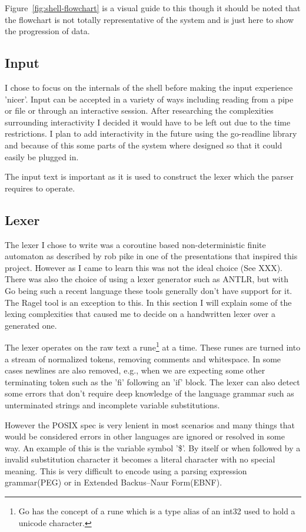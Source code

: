 Figure~\ref{fig:shell-flowchart} is a visual guide to this though it should be noted that the flowchart is not totally representative of the system and is just here to show the progression of data.


\subsection{Input}
I chose to focus on the internals of the shell before making the input experience 'nicer'.
Input can be accepted in a variety of ways including reading from a pipe or file or through an interactive session.
After researching the complexities surrounding interactivity I decided it would have to be left out due to the time restrictions.
I plan to add interactivity in the future using the go-readline library\cite{GO-READLINE} and because of this some parts of the system where designed so that it could easily be plugged in.

The input text is important as it is used to construct the lexer which the parser requires to operate.

\subsection{Lexer}
The lexer I chose to write was a coroutine based non-deterministic finite automaton as described by rob pike in one of the presentations that inspired this project\cite{PIKE-LEXING-VIDEO}.
However as I came to learn this was not the ideal choice (See XXX).
There was also the choice of using a lexer generator such as ANTLR, but with Go being such a recent language these tools generally don't have support for it.
The Ragel tool is an exception to this.
In this section I will explain some of the lexing complexities that caused me to decide on a handwritten lexer over a generated one.

The lexer operates on the raw text a rune\footnote{Go has the concept of a rune which is a type alias of an int32 used to hold a unicode character.} at a time.
These runes are turned into a stream of normalized tokens, removing comments and whitespace.
In some cases newlines are also removed, e.g., when we are expecting some other terminating token such as the 'fi' following an 'if' block.
The lexer can also detect some errors that don't require deep knowledge of the language grammar such as unterminated strings and incomplete variable substitutions. 

However the POSIX spec is very lenient in most scenarios and many things that would be considered errors in other languages are ignored or resolved in some way.
An example of this is the variable symbol '\$'.
By itself or when followed by a invalid substitution character it becomes a literal character with no special meaning. This is very difficult to encode using a parsing expression grammar(PEG) or in Extended Backus–Naur Form(EBNF).

